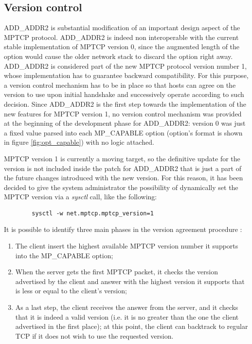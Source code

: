 \subsection{Version control}
\label{retrocomp}
ADD\_ADDR2 is substantial modification of an important design aspect of the MPTCP protocol. ADD\_ADDR2 is indeed non interoperable with the current stable implementation of MPTCP version 0, since the augmented length of the option would cause the older network stack to discard the option right away.
ADD\_ADDR2 is considered part of the new MPTCP protocol version number 1, whose implementation has to guarantee backward compatibility. For this purpose, a version control mechanism has to be in place so that hosts can agree on the version to use upon initial handshake and successively operate according to such decision. Since ADD\_ADDR2 is the first step towards the implementation of the new features for MPTCP version 1, no version control mechanism was provided at the beginning of the development phase for ADD\_ADDR2: version 0 was just a fixed value parsed into each MP\_CAPABLE option (option's format is shown in figure \ref{fig:opt_capable}) with no logic attached.

MPTCP version 1 is currently a moving target, so the definitive update for the version is not included inside the patch for ADD\_ADDR2 that is just a part of the future changes introduced with the new version. For this reason, it has been decided to give the system administrator the possibility of dynamically set the MPTCP version via a \textit{sysctl} call, like the following:

\begin{verbatim}
        sysctl -w net.mptcp.mptcp_version=1
\end{verbatim}

It is possible to identify three main phases in the version agreement procedure \cite{rfc6824bis04}:

\begin{enumerate}
  \item The client insert the highest available MPTCP version number it supports into the MP\_CAPABLE option;
  \item When the server gets the first MPTCP packet, it checks the version advertised by the client and answer with the highest version it supports that is less or equal to the client's version;
  \item As a last step, the client receives the answer from the server, and it checks that it is indeed a valid version (i.e. it is no greater than the one the client advertised in the first place); at this point, the client can backtrack to regular TCP if it does not wish to use the requested version.
\end{enumerate}

